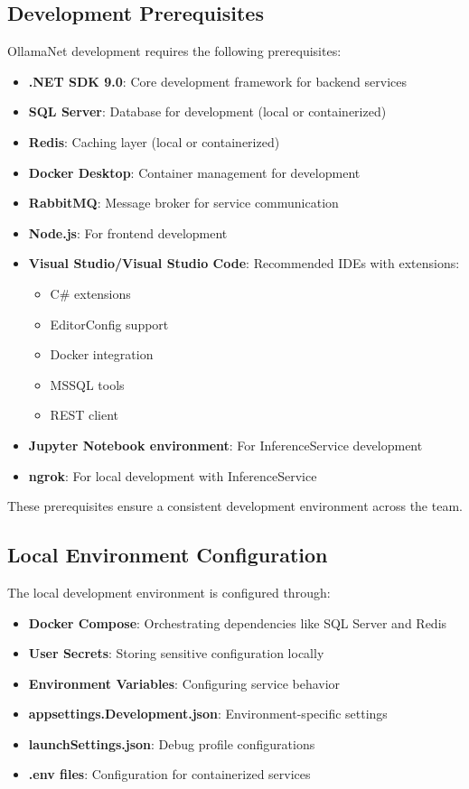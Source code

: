 \subsection{Development Prerequisites}
OllamaNet development requires the following prerequisites:
\begin{itemize}
    \item \textbf{.NET SDK 9.0}: Core development framework for backend services
    \item \textbf{SQL Server}: Database for development (local or containerized)
    \item \textbf{Redis}: Caching layer (local or containerized)
    \item \textbf{Docker Desktop}: Container management for development
    \item \textbf{RabbitMQ}: Message broker for service communication
    \item \textbf{Node.js}: For frontend development
    \item \textbf{Visual Studio/Visual Studio Code}: Recommended IDEs with extensions:
    \begin{itemize}
        \item C\# extensions
        \item EditorConfig support
        \item Docker integration
        \item MSSQL tools
        \item REST client
    \end{itemize}
    \item \textbf{Jupyter Notebook environment}: For InferenceService development
    \item \textbf{ngrok}: For local development with InferenceService
\end{itemize}

These prerequisites ensure a consistent development environment across the team.

\subsection{Local Environment Configuration}
The local development environment is configured through:
\begin{itemize}
    \item \textbf{Docker Compose}: Orchestrating dependencies like SQL Server and Redis
    \item \textbf{User Secrets}: Storing sensitive configuration locally
    \item \textbf{Environment Variables}: Configuring service behavior
    \item \textbf{appsettings.Development.json}: Environment-specific settings
    \item \textbf{launchSettings.json}: Debug profile configurations
    \item \textbf{.env files}: Configuration for containerized services
\end{itemize}

